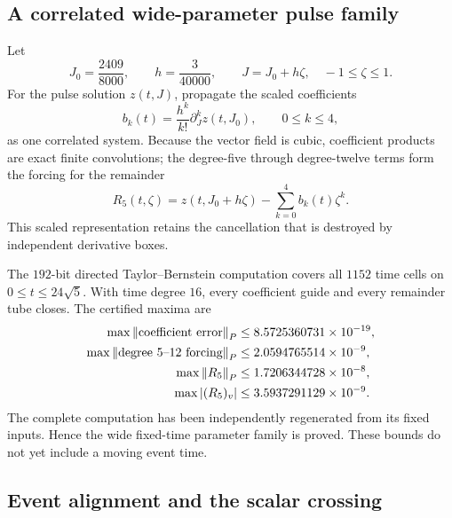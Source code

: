 \subsection{A correlated wide-parameter pulse family}

Let
\[
 J_0=\frac{2409}{8000},\qquad
 h=\frac3{40000},\qquad J=J_0+h\zeta,\quad -1\le\zeta\le1.
\]
For the pulse solution \(z(t,J)\), propagate the scaled coefficients
\begin{equation}
 b_k(t)=\frac{h^k}{k!}\partial_J^kz(t,J_0),
 \qquad 0\le k\le4,                                    \label{eq:scaled-jet}
\end{equation}
as one correlated system.  Because the vector field is cubic, coefficient
products are exact finite convolutions; the degree-five through degree-twelve
terms form the forcing for the remainder
\begin{equation}
 R_5(t,\zeta)=z(t,J_0+h\zeta)-\sum_{k=0}^4b_k(t)\zeta^k.
                                                               \label{eq:R5}
\end{equation}
This scaled representation retains the cancellation that is destroyed by
independent derivative boxes.

The \(192\)-bit directed Taylor--Bernstein computation covers all \(1152\)
time cells on \(0\le t\le24\sqrt5\).  With time degree \(16\), every
coefficient guide and every remainder tube closes.  The certified maxima
are
\begin{align}
 \max\left\lVert\text{coefficient error}\right\rVert_P
   &\le8.5725360731\times10^{-19},\\
 \max\left\lVert\text{degree }5\text{--}12\text{ forcing}\right\rVert_P
   &\le2.0594765514\times10^{-9},\\
 \max\left\lVert R_5\right\rVert_P
   &\le1.7206344728\times10^{-8},                       \label{eq:wide-jet-bounds}\\
 \max\left\lvert(R_5)_v\right\rvert
   &\le3.5937291129\times10^{-9}.
\end{align}
The complete computation has been independently regenerated from its fixed
inputs.  Hence the wide fixed-time parameter family is proved.  These bounds
do not yet include a moving event time.

\subsection{Event alignment and the scalar crossing}

